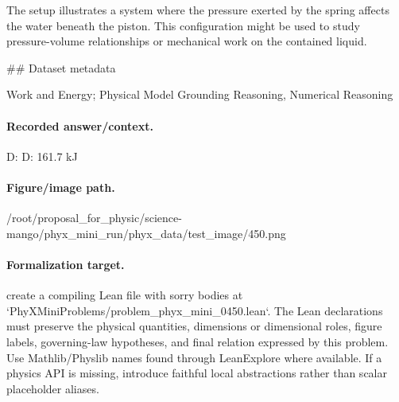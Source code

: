 The setup illustrates a system where the pressure exerted by the spring affects the water beneath the piston. This configuration might be used to study pressure-volume relationships or mechanical work on the contained liquid.

\#\# Dataset metadata

Work and Energy; Physical Model Grounding Reasoning, Numerical Reasoning

\paragraph{Recorded answer/context.}
D: D: 161.7 kJ

\paragraph{Figure/image path.}
/root/proposal\_for\_physic/science-mango/phyx\_mini\_run/phyx\_data/test\_image/450.png

\paragraph{Formalization target.}
create a compiling Lean file with sorry bodies at `PhyXMiniProblems/problem\_phyx\_mini\_0450.lean`. The Lean declarations must preserve the physical quantities, dimensions or dimensional roles, figure labels, governing-law hypotheses, and final relation expressed by this problem.
Use Mathlib/Physlib names found through LeanExplore where available. If a physics API is missing, introduce faithful local abstractions rather than scalar placeholder aliases.

